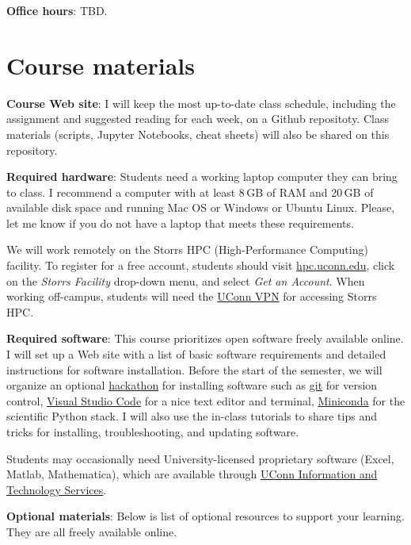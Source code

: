 \documentclass[11pt]{article}
\begin{document}
\textbf{Office hours}: TBD.


\section*{Course materials}

\textbf{Course Web site}: I will keep the most up-to-date class schedule, including the assignment and suggested reading for each week, on a Github repositoty. Class materials (scripts, Jupyter Notebooks, cheat sheets) will also be shared on this repository. 

\textbf{Required hardware}: Students need a working laptop computer they can bring to class. I recommend a computer with at least 8\,GB of RAM and 20\,GB of available disk space and running Mac OS or Windows or Ubuntu Linux.  Please, let me know if you do not have a laptop that meets these requirements. 

We will work remotely on the Storrs HPC (High-Performance Computing) facility. To register for a free account, students should visit \url{hpc.uconn.edu}, click on the \emph{Storrs Facility} drop-down menu, and select \emph{Get an Account}.  When working off-campus, students will need the \href{https://confluence.uconn.edu/ikb/remote-access/virtual-private-network-vpn/accessing-the-uconn-network-through-a-vpn-client}{UConn VPN} for accessing Storrs HPC.


\textbf{Required software}:  This course prioritizes open software freely
available online. I will set up a Web site with a list of basic software
requirements and detailed instructions for software installation. Before the
start of the semester, we will organize an optional
\href{https://hackathon.guide}{hackathon} for installing software such as
\href{https://git-scm.com/book/en/v2/Getting-Started-Installing-Git}{git} for
version control, \href{https://code.visualstudio.com/}{Visual Studio Code} for
a nice text editor and terminal, \href{https://docs.conda.io/en/latest/miniconda.html}{Miniconda} for the scientific Python stack. I will also use the in-class tutorials to share tips and tricks for installing, troubleshooting, and updating software.

Students may occasionally need University-licensed proprietary software (Excel, Matlab, Mathematica), which are available through \href{https://software.uconn.edu/software}{UConn Information and Technology Services}.

\textbf{Optional materials}: Below is list of optional resources to support your learning. They are all freely available online.
\end{document}
